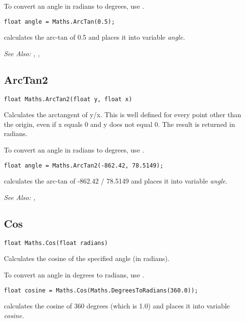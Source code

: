 To convert an angle in radians to degrees, use .

\begin{verbatim}
float angle = Maths.ArcTan(0.5);
\end{verbatim}
calculates the arc-tan of 0.5 and places it into variable \it{angle}.

\it{See Also:} ,
,


\subsection{ArcTan2}\label{Maths.ArcTan2}%

\begin{verbatim}
float Maths.ArcTan2(float y, float x)
\end{verbatim}
Calculates the arctangent of y/x. This is well defined for every point other than the origin,
even if x equals 0 and y does not equal 0. The result is returned in radians.

To convert an angle in radians to degrees, use .

\begin{verbatim}
float angle = Maths.ArcTan2(-862.42, 78.5149);
\end{verbatim}
calculates the arc-tan of -862.42 / 78.5149 and places it into variable \it{angle}.

\it{See Also:} ,


\subsection{Cos}\label{Maths.Cos}%

\begin{verbatim}
float Maths.Cos(float radians)
\end{verbatim}
Calculates the cosine of the specified angle (in radians).

To convert an angle in degrees to radians, use .

\begin{verbatim}
float cosine = Maths.Cos(Maths.DegreesToRadians(360.0));
\end{verbatim}
calculates the cosine of 360 degrees (which is 1.0) and places it into variable \it{cosine}.

